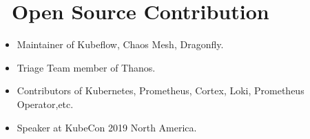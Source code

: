 \documentclass{resume}
\begin{document}
\section{\faInfo\ Open Source Contribution}
\begin{itemize}[parsep=0.5ex]
  \item Maintainer of Kubeflow, Chaos Mesh, Dragonfly.
  \item Triage Team member of Thanos.
  \item Contributors of Kubernetes, Prometheus, Cortex, Loki, Prometheus Operator,etc.
  \item Speaker at KubeCon 2019 North America.
\end{itemize}
\end{document}
